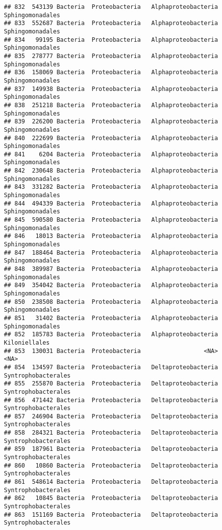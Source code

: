 \documentclass[
]{article}
\begin{document}
\begin{verbatim}
## 832  543139 Bacteria  Proteobacteria   Alphaproteobacteria    Sphingomonadales
## 833  552687 Bacteria  Proteobacteria   Alphaproteobacteria    Sphingomonadales
## 834   99195 Bacteria  Proteobacteria   Alphaproteobacteria    Sphingomonadales
## 835  278777 Bacteria  Proteobacteria   Alphaproteobacteria    Sphingomonadales
## 836  158069 Bacteria  Proteobacteria   Alphaproteobacteria    Sphingomonadales
## 837  149938 Bacteria  Proteobacteria   Alphaproteobacteria    Sphingomonadales
## 838  251218 Bacteria  Proteobacteria   Alphaproteobacteria    Sphingomonadales
## 839  226200 Bacteria  Proteobacteria   Alphaproteobacteria    Sphingomonadales
## 840  222699 Bacteria  Proteobacteria   Alphaproteobacteria    Sphingomonadales
## 841    6204 Bacteria  Proteobacteria   Alphaproteobacteria    Sphingomonadales
## 842  230648 Bacteria  Proteobacteria   Alphaproteobacteria    Sphingomonadales
## 843  331282 Bacteria  Proteobacteria   Alphaproteobacteria    Sphingomonadales
## 844  494339 Bacteria  Proteobacteria   Alphaproteobacteria    Sphingomonadales
## 845  590580 Bacteria  Proteobacteria   Alphaproteobacteria    Sphingomonadales
## 846   18013 Bacteria  Proteobacteria   Alphaproteobacteria    Sphingomonadales
## 847  188464 Bacteria  Proteobacteria   Alphaproteobacteria    Sphingomonadales
## 848  389987 Bacteria  Proteobacteria   Alphaproteobacteria    Sphingomonadales
## 849  354042 Bacteria  Proteobacteria   Alphaproteobacteria    Sphingomonadales
## 850  238508 Bacteria  Proteobacteria   Alphaproteobacteria    Sphingomonadales
## 851   31402 Bacteria  Proteobacteria   Alphaproteobacteria    Sphingomonadales
## 852  185783 Bacteria  Proteobacteria   Alphaproteobacteria       Kiloniellales
## 853  130031 Bacteria  Proteobacteria                  <NA>                <NA>
## 854  134597 Bacteria  Proteobacteria   Deltaproteobacteria Syntrophobacterales
## 855  255870 Bacteria  Proteobacteria   Deltaproteobacteria Syntrophobacterales
## 856  471442 Bacteria  Proteobacteria   Deltaproteobacteria Syntrophobacterales
## 857  246904 Bacteria  Proteobacteria   Deltaproteobacteria Syntrophobacterales
## 858  284321 Bacteria  Proteobacteria   Deltaproteobacteria Syntrophobacterales
## 859  187961 Bacteria  Proteobacteria   Deltaproteobacteria Syntrophobacterales
## 860   10860 Bacteria  Proteobacteria   Deltaproteobacteria Syntrophobacterales
## 861  548614 Bacteria  Proteobacteria   Deltaproteobacteria Syntrophobacterales
## 862   10845 Bacteria  Proteobacteria   Deltaproteobacteria Syntrophobacterales
## 863  151169 Bacteria  Proteobacteria   Deltaproteobacteria Syntrophobacterales

\end{verbatim}
\end{document}
